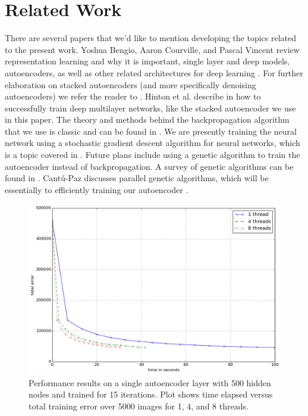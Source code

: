\documentclass[conference]{IEEEtran}
\begin{document}
\section{Related Work}
There are several papers that we'd like to mention developing the topics related to the present work. Yoshua Bengio, Aaron Courville, and Pascal Vincent review representation learning and why it is important,
single layer and deep models, autoencoders, as well as other related architectures for deep learning \cite{bengio2012rep}. For further elaboration on stacked autoencoders (and more specifically denoising autoencoders)
we refer the reader to \cite{vincent2010stacked}. Hinton et al. describe in \cite{hinton2006learning} how to successfully train deep multilayer networks, like the stacked autoencoder we use in this paper. The theory and methods behind the backpropagation algorithm that we use
is classic and can be found in \cite{hecht1989theory}. We are presently training the neural network using a stochastic gradient descent algorithm for neural networks, which is a topic covered in \cite{bottou-91c}.
Future plans include using a genetic algorithm to train the autoencoder instead of backpropagation. A survey of genetic algorithms can be found in \cite{srinivas1994genetic}.
Cant{\'u}-Paz discusses parallel genetic algorithms, which will be essentially to efficiently training our autoencoder \cite{cantu1998survey}.

\begin{figure}[h]
\centering
\includegraphics[width=0.9\linewidth]{experiment1.png}
\caption{Performance results on a single autoencoder layer with 500 hidden nodes and trained for 15 iterations. Plot shows time elapsed versus total training error over 5000 images for 1, 4, and 8 threads.}
\label{fig:experiment1}
\end{figure}
\end{document}
